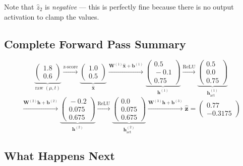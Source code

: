 \documentclass[11pt,a4paper]{article}
\newcommand{\bz}{\mathbf{z}}
\newcommand{\bx}{\mathbf{x}}
\newcommand{\bW}{\mathbf{W}}
\newcommand{\bb}{\mathbf{b}}
\newcommand{\bh}{\mathbf{h}}
\begin{document}
Note that $\hat{z}_2$ is \emph{negative} --- this is perfectly fine
because there is no output activation to clamp the values.

\subsection{Complete Forward Pass Summary}

\[
\underbrace{\begin{pmatrix} 1.8 \\ 0.6 \end{pmatrix}}_{\text{raw } (\mu,t)}
\xrightarrow{\text{z-score}}
\underbrace{\begin{pmatrix} 1.0 \\ 0.5 \end{pmatrix}}_{\hat{\bx}}
\xrightarrow{\bW^{(1)}\hat{\bx}+\bb^{(1)}}
\underbrace{\begin{pmatrix} 0.5 \\ \!\!-0.1 \\ 0.75 \end{pmatrix}}_{\bh^{(1)}}
\xrightarrow{\text{ReLU}}
\underbrace{\begin{pmatrix} 0.5 \\ 0.0 \\ 0.75 \end{pmatrix}}_{\bh^{(1)}_\text{act}}
\]
\[
\xrightarrow{\bW^{(2)}\bh+\bb^{(2)}}
\underbrace{\begin{pmatrix} \!\!-0.2 \\ 0.075 \\ 0.675 \end{pmatrix}}_{\bh^{(2)}}
\xrightarrow{\text{ReLU}}
\underbrace{\begin{pmatrix} 0.0 \\ 0.075 \\ 0.675 \end{pmatrix}}_{\bh^{(2)}_\text{act}}
\xrightarrow{\bW^{(3)}\bh+\bb^{(3)}}
\boxed{\hat{\bz} = \begin{pmatrix} 0.77 \\ -0.3175 \end{pmatrix}}
\]

\subsection{What Happens Next}
\end{document}
